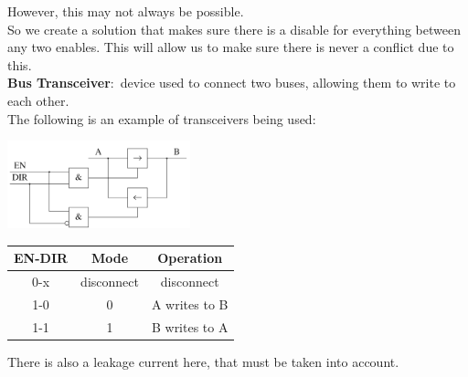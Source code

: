 \documentclass[nobib]{tufte-handout}
\newcommand{\defn}[2]{\noindent\textbf{#1}:\ #2}
\begin{document}
    However, this may not always be possible.\\
    So we create a solution that makes sure there is a disable for everything between any two enables. This will allow us to make sure there is never a conflict due to this.\\
    \defn{Bus Transceiver}{device used to connect two buses, allowing them to write to each other.}\\
    The following is an example of transceivers being used:
    \begin{center}
        \includegraphics[width = 200px]{images/transcieveruse.png}
    \end{center}
    \begin{table}
        \centering
        \begin{tabular}{c|c|c}
            EN-DIR & Mode       & Operation     \\
            \hline
            0-x    & disconnect & disconnect    \\
            1-0    & 0          & A writes to B \\
            1-1    & 1          & B writes to A

        \end{tabular}
    \end{table}
    There is also a leakage current here, that must be taken into account.
\end{document}
